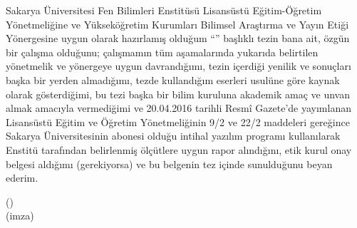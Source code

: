 
Sakarya Üniversitesi Fen Bilimleri Enstitüsü Lisansüstü Eğitim-Öğretim Yönetmeliğine ve Yükseköğretim Kurumları Bilimsel Araştırma ve Yayın Etiği Yönergesine uygun olarak hazırlamış olduğum ``\TezBasligi'' başlıklı tezin bana ait, özgün bir çalışma olduğunu; çalışmamın tüm aşamalarında yukarıda belirtilen yönetmelik ve yönergeye uygun davrandığımı, tezin içerdiği yenilik ve sonuçları başka bir yerden almadığımı, tezde kullandığım eserleri usulüne göre kaynak olarak gösterdiğimi, bu tezi başka bir bilim kuruluna akademik amaç ve unvan almak amacıyla vermediğimi ve 20.04.2016 tarihli Resmî Gazete'de yayımlanan Lisansüstü Eğitim ve Öğretim Yönetmeliğinin 9/2 ve 22/2 maddeleri gereğince Sakarya Üniversitesinin abonesi olduğu intihal yazılım programı kullanılarak Enstitü tarafından belirlenmiş ölçütlere uygun rapor alındığını, etik kurul onay belgesi aldığımı (gerekiyorsa) ve bu belgenin tez içinde sunulduğunu beyan ederim.

\vspace{18mm}
\begin{flushright}
(\SavunmaTarihi)\\
(imza)\\
\TezYazari
\end{flushright}

